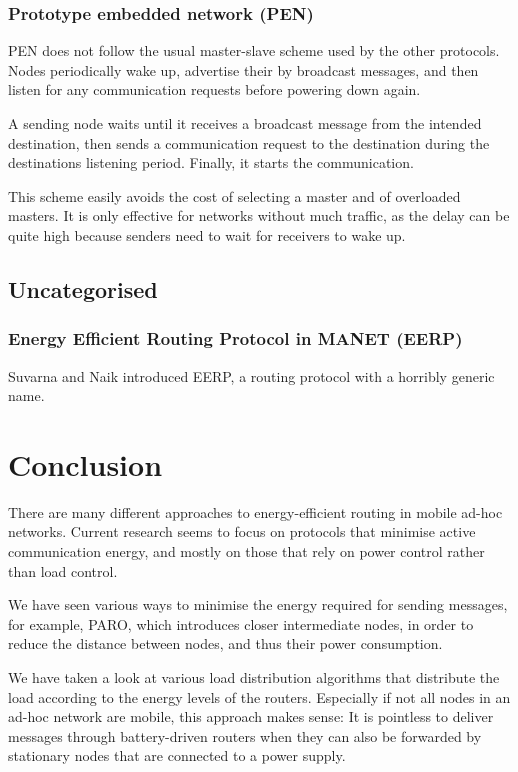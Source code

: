 \documentclass[conference]{IEEEtran}
\begin{document}

\subsubsection{Prototype embedded network (PEN)}
PEN\cite{girling2000design} does not follow the usual master-slave scheme
used by the other protocols. Nodes periodically wake up, advertise their
by broadcast messages, and then listen for any communication requests before
powering down again.

A sending node waits until it receives a broadcast message from the intended
destination, then sends a communication request to the destination during
the destinations listening period. Finally, it starts the communication.

This scheme easily avoids the cost of selecting a master and of overloaded
masters. It is only effective for networks without much traffic, as the delay
can be quite high because senders need to wait for receivers to wake up.



\subsection{Uncategorised}




\subsubsection{Energy Efficient Routing Protocol in MANET (EERP)}
Suvarna and Naik introduced EERP, a routing protocol with a horribly
generic name\cite{main2}.

\section{Conclusion}
There are many different approaches to energy-efficient routing in
mobile ad-hoc networks. Current research seems to focus on protocols
that minimise active communication energy, and mostly on those that
rely on power control rather than load control.

We have seen various ways to minimise the energy required for sending
messages, for example, PARO, which introduces closer intermediate nodes,
in order to reduce the distance between nodes, and thus their
power consumption.

We have taken a look at various load distribution algorithms that distribute
the load according to the energy levels of the routers. Especially if not all
nodes in an ad-hoc network are mobile, this approach makes sense: It is
pointless to deliver messages through battery-driven routers when they can
also be forwarded by stationary nodes that are connected to a power supply.
\end{document}
